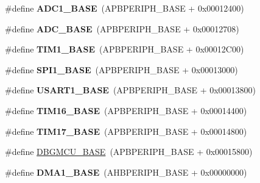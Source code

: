 \begin{DoxyCompactItemize}
\#define {\bfseries A\+D\+C1\+\_\+\+B\+A\+SE}~(A\+P\+B\+P\+E\+R\+I\+P\+H\+\_\+\+B\+A\+SE + 0x00012400)
\item 
\mbox{\label{group___peripheral__memory__map_gad06cb9e5985bd216a376f26f22303cd6}} 
\#define {\bfseries A\+D\+C\+\_\+\+B\+A\+SE}~(A\+P\+B\+P\+E\+R\+I\+P\+H\+\_\+\+B\+A\+SE + 0x00012708)
\item 
\mbox{\label{group___peripheral__memory__map_gaf8aa324ca5011b8173ab16585ed7324a}} 
\#define {\bfseries T\+I\+M1\+\_\+\+B\+A\+SE}~(A\+P\+B\+P\+E\+R\+I\+P\+H\+\_\+\+B\+A\+SE + 0x00012\+C00)
\item 
\mbox{\label{group___peripheral__memory__map_ga50cd8b47929f18b05efbd0f41253bf8d}} 
\#define {\bfseries S\+P\+I1\+\_\+\+B\+A\+SE}~(A\+P\+B\+P\+E\+R\+I\+P\+H\+\_\+\+B\+A\+SE + 0x00013000)
\item 
\mbox{\label{group___peripheral__memory__map_ga86162ab3f740db9026c1320d46938b4d}} 
\#define {\bfseries U\+S\+A\+R\+T1\+\_\+\+B\+A\+SE}~(A\+P\+B\+P\+E\+R\+I\+P\+H\+\_\+\+B\+A\+SE + 0x00013800)
\item 
\mbox{\label{group___peripheral__memory__map_ga16c97093a531d763b0794c3e6d09e1bf}} 
\#define {\bfseries T\+I\+M16\+\_\+\+B\+A\+SE}~(A\+P\+B\+P\+E\+R\+I\+P\+H\+\_\+\+B\+A\+SE + 0x00014400)
\item 
\mbox{\label{group___peripheral__memory__map_gaffbedbe30e8c4cffdea326d6c1800574}} 
\#define {\bfseries T\+I\+M17\+\_\+\+B\+A\+SE}~(A\+P\+B\+P\+E\+R\+I\+P\+H\+\_\+\+B\+A\+SE + 0x00014800)
\item 
\#define \hyperlink{group___peripheral__memory__map_ga4adaf4fd82ccc3a538f1f27a70cdbbef}{D\+B\+G\+M\+C\+U\+\_\+\+B\+A\+SE}~(A\+P\+B\+P\+E\+R\+I\+P\+H\+\_\+\+B\+A\+SE + 0x00015800)
\item 
\mbox{\label{group___peripheral__memory__map_gab2d8a917a0e4ea99a22ac6ebf279bc72}} 
\#define {\bfseries D\+M\+A1\+\_\+\+B\+A\+SE}~(A\+H\+B\+P\+E\+R\+I\+P\+H\+\_\+\+B\+A\+SE + 0x00000000)
\item 
\mbox{\label{group___peripheral__memory__map_ga888dbc1608243badeb3554ffedc7364c}} 

\end{DoxyCompactItemize}
